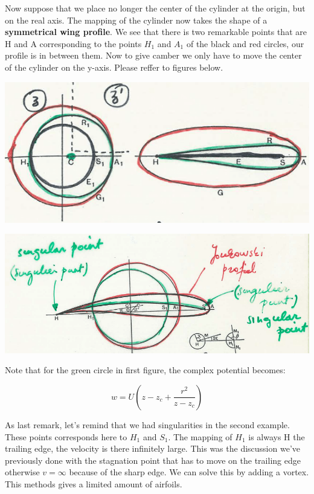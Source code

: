 		Now suppose that we place no longer the center of the cylinder at the origin, but on the real axis. The mapping of the cylinder now takes the shape of a \textbf{symmetrical wing profile}. We see that there is two remarkable points that are H and A corresponding to the points $H_1$ and $A_1$ of the black and red circles, our profile is in between them. Now to give camber we only have to move the center of the cylinder on the y-axis. Please reffer to figures below. 
		
		\begin{center}
		\begin{minipage}{0.45\textwidth}
		\includegraphics[scale=0.3]{ch2/31}
		\end{minipage}
		\begin{minipage}{0.45\textwidth}
		\includegraphics[scale=0.2]{ch2/32}
		\end{minipage}
		\end{center}
		
		Note that for the green circle in first figure, the complex potential becomes:
		
		\begin{equation}
		w = U\left( z-z_c + \frac{r^2}{z-z_c} \right)
		\end{equation}
		
		As last remark, let's remind that we had singularities in the second example. These points corresponds here to $H_1$ and $S_1$. The mapping of $H_1$ is always H the trailing edge, the velocity is there infinitely large. This was the discussion we've previously done with the stagnation point that has to move on the trailing edge otherwise $v = \infty$ because of the sharp edge. We can solve this by adding a vortex. This methods gives a limited amount of airfoils. 
		
